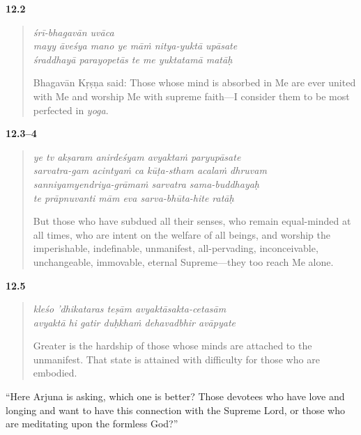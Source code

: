 \par\noindent\textbf{12.2}\par
\begin{verse}
\textit{śrī-bhagavān uvāca} \\
\textit{mayy āveśya mano ye māṁ nitya-yuktā upāsate} \\
\textit{śraddhayā parayopetās te me yuktatamā matāḥ}

\noindent Bhagavān Kṛṣṇa said: Those whose mind is absorbed in Me are ever united with Me and worship Me with supreme faith---I consider them to be most perfected in \textit{yoga}.
\end{verse}
\par



\par\noindent\textbf{12.3–4}\par
\begin{verse}
\textit{ye tv akṣaram anirdeśyam avyaktaṁ paryupāsate} \\
\textit{sarvatra-gam acintyaṁ ca kūṭa-stham acalaṁ dhruvam} \\
\textit{sanniyamyendriya-grāmaṁ sarvatra sama-buddhayaḥ} \\
\textit{te prāpnuvanti mām eva sarva-bhūta-hite ratāḥ}

\noindent But those who have subdued all their senses, who remain equal-minded at all times, who are intent on the welfare of all beings, and worship the imperishable, indefinable, unmanifest, all-pervading, inconceivable, unchangeable, immovable, eternal Supreme---they too reach Me alone.
\end{verse}
\par



\par\noindent\textbf{12.5}\par
\begin{verse}
\textit{kleśo ’dhikataras teṣām avyaktāsakta-cetasām} \\
\textit{avyaktā hi gatir duḥkhaṁ dehavadbhir avāpyate}

\noindent Greater is the hardship of those whose minds are attached to the unmanifest. That state is attained with difficulty for those who are embodied.
\end{verse}
\par


\enquote{Here Arjuna is asking, which one is better? Those devotees who have love and longing and want to have this connection with the Supreme Lord, or those who are meditating upon the formless God?}

